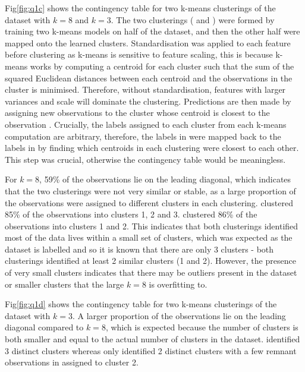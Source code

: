     Fig\eqref{fig:q1c} shows the contingency table for two k-means clusterings of the dataset with $k=8$ and $k=3$.
    The two clusterings ( and ) were formed by training two k-means models on
    half of the dataset, and then the other half were mapped onto the learned clusters.
    Standardisation was applied to each feature before clustering as k-means is sensitive to feature scaling, this is because
    k-means works by computing a centroid for each cluster such that the sum of the squared Euclidean distances between
    each centroid and the observations in the cluster is minimised.
    Therefore, without standardisation, features with larger variances and scale will dominate the clustering.
    Predictions are then made by assigning new observations to the cluster whose centroid is closest to the
    observation \cite{sklearn-k-means}.
    Crucially, the labels assigned to each cluster from each k-means computation are arbitrary, therefore, the labels
    in  were mapped back to the labels in  by finding which centroids in each
    clustering were closest to each other.
    This step was crucial, otherwise the contingency table would be meaningless.

    For $k=8$, 59\% of the observations lie on the leading diagonal, which indicates that the two clusterings were not very
    similar or stable, as a large proportion of the observations were assigned to different clusters in each clustering.
     clustered 85\% of the observations into clusters 1, 2 and 3.
     clustered 86\% of the observations into clusters 1 and 2.
    This indicates that both clusterings identified most of the data lives within a small set of clusters, which was
    expected as the dataset is labelled and so it is known that there are only 3 clusters - both clusterings identified
    at least 2 similar clusters (1 and 2).
    However, the presence of very small clusters indicates that there may be outliers present in the dataset or smaller
    clusters that the large $k=8$ is overfitting to.

    Fig\eqref{fig:q1d} shows the contingency table for two k-means clusterings of the dataset with $k=3$.
    A larger proportion of the observations lie on the leading diagonal compared to $k=8$, which is expected because
    the number of clusters is both smaller and equal to the actual number of clusters in the dataset.
     identified 3 distinct clusters whereas  only identified 2 distinct
    clusters with a few remnant observations in assigned to cluster 2.
